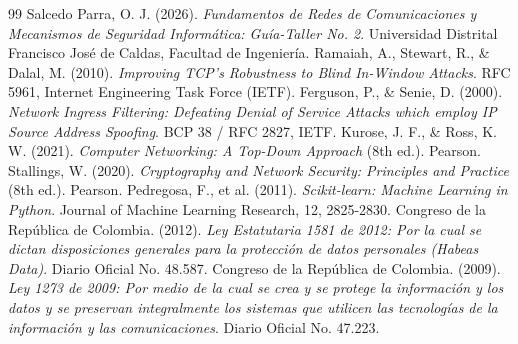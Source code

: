 \documentclass[11pt,letterpaper]{article}
\begin{document}
\newpage
\begin{thebibliography}{99}
     Salcedo Parra, O. J. (2026). \textit{Fundamentos de Redes de Comunicaciones y Mecanismos de Seguridad Informática: Guía-Taller No. 2}. Universidad Distrital Francisco José de Caldas, Facultad de Ingeniería.
     Ramaiah, A., Stewart, R., \& Dalal, M. (2010). \textit{Improving TCP's Robustness to Blind In-Window Attacks}. RFC 5961, Internet Engineering Task Force (IETF).
     Ferguson, P., \& Senie, D. (2000). \textit{Network Ingress Filtering: Defeating Denial of Service Attacks which employ IP Source Address Spoofing}. BCP 38 / RFC 2827, IETF.
     Kurose, J. F., \& Ross, K. W. (2021). \textit{Computer Networking: A Top-Down Approach} (8th ed.). Pearson.
     Stallings, W. (2020). \textit{Cryptography and Network Security: Principles and Practice} (8th ed.). Pearson.
     Pedregosa, F., et al. (2011). \textit{Scikit-learn: Machine Learning in Python}. Journal of Machine Learning Research, 12, 2825-2830.
     Congreso de la República de Colombia. (2012). \textit{Ley Estatutaria 1581 de 2012: Por la cual se dictan disposiciones generales para la protección de datos personales (Habeas Data)}. Diario Oficial No. 48.587.
     Congreso de la República de Colombia. (2009). \textit{Ley 1273 de 2009: Por medio de la cual se crea y se protege la información y los datos y se preservan integralmente los sistemas que utilicen las tecnologías de la información y las comunicaciones}. Diario Oficial No. 47.223.
\end{thebibliography}
\end{document}
